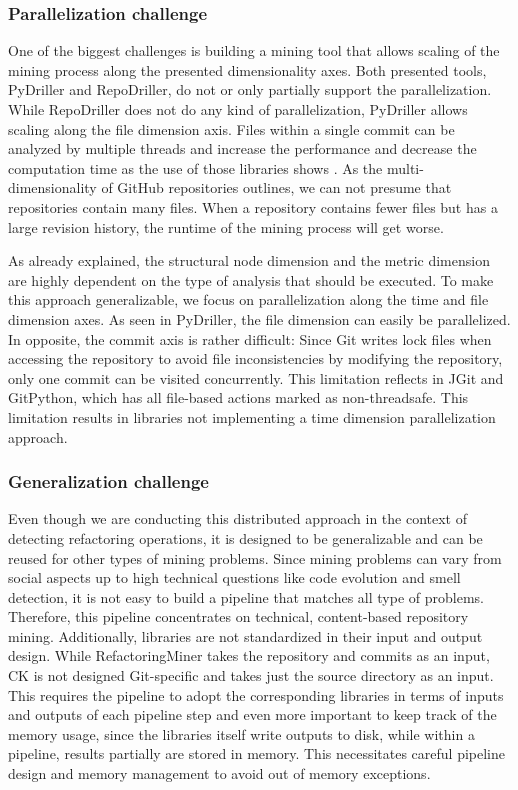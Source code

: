 \subsubsection{Parallelization challenge}
One of the biggest challenges is building a mining tool that allows scaling of the mining process along the presented dimensionality axes. Both presented tools, PyDriller and RepoDriller, do not or only partially support the parallelization. While RepoDriller does not do any kind of parallelization, PyDriller allows scaling along the file dimension axis. Files within a single commit can be analyzed by multiple threads and increase the performance and decrease the computation time as the use of those libraries shows \cite{Gote2019}. As the multi-dimensionality of GitHub repositories outlines, we can not presume that repositories contain many files. When a repository contains fewer files but has a large revision history, the runtime of the mining process will get worse.

As already explained, the structural node dimension and the metric dimension are highly dependent on the type of analysis that should be executed. To make this approach generalizable, we focus on parallelization along the time and file dimension axes. As seen in PyDriller, the file dimension can easily be parallelized. In opposite, the commit axis is rather difficult: Since Git writes lock files when accessing the repository to avoid file inconsistencies by modifying the repository, only one commit can be visited concurrently. This limitation reflects in JGit and GitPython, which has all file-based actions marked as non-threadsafe. This limitation results in libraries not implementing a time dimension parallelization approach.

\subsubsection{Generalization challenge}
Even though we are conducting this distributed approach in the context of detecting refactoring operations, it is designed to be generalizable and can be reused for other types of mining problems. Since mining problems can vary from social aspects up to high technical questions like code evolution and smell detection, it is not easy to build a pipeline that matches all type of problems. Therefore, this pipeline concentrates on technical, content-based repository mining. Additionally, libraries are not standardized in their input and output design. While RefactoringMiner takes the repository and commits as an input, CK is not designed Git-specific and takes just the source directory as an input. This requires the pipeline to adopt the corresponding libraries in terms of inputs and outputs of each pipeline step and even more important to keep track of the memory usage, since the libraries itself write outputs to disk, while within a pipeline, results partially are stored in memory. This necessitates careful pipeline design and memory management to avoid out of memory exceptions.